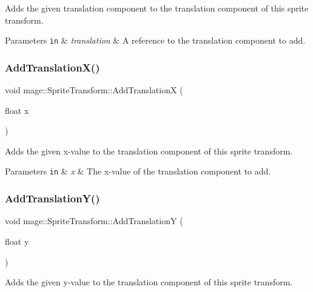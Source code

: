 Adds the given translation component to the translation component of this sprite transform.


\begin{DoxyParams}[1]{Parameters}
\mbox{\tt in}  & {\em translation} & A reference to the translation component to add. \\
\hline
\end{DoxyParams}
\hypertarget{structmage_1_1_sprite_transform_a19726f8905e837126c0d566c7e68ea3c}{}\label{structmage_1_1_sprite_transform_a19726f8905e837126c0d566c7e68ea3c} 
\subsubsection{\texorpdfstring{Add\+Translation\+X()}{AddTranslationX()}}
{\footnotesize\ttfamily void mage\+::\+Sprite\+Transform\+::\+Add\+TranslationX (\begin{DoxyParamCaption}\item[{float}]{x }\end{DoxyParamCaption})}

Adds the given x-\/value to the translation component of this sprite transform.


\begin{DoxyParams}[1]{Parameters}
\mbox{\tt in}  & {\em x} & The x-\/value of the translation component to add. \\
\hline
\end{DoxyParams}
\hypertarget{structmage_1_1_sprite_transform_ad3d94aefc790ec25ba67563fbc8b8dab}{}\label{structmage_1_1_sprite_transform_ad3d94aefc790ec25ba67563fbc8b8dab} 
\subsubsection{\texorpdfstring{Add\+Translation\+Y()}{AddTranslationY()}}
{\footnotesize\ttfamily void mage\+::\+Sprite\+Transform\+::\+Add\+TranslationY (\begin{DoxyParamCaption}\item[{float}]{y }\end{DoxyParamCaption})}

Adds the given y-\/value to the translation component of this sprite transform.


